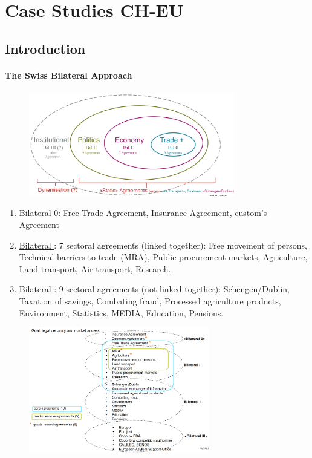 \section{Case Studies CH-EU}

\subsection{Introduction}

\paragraph{The Swiss Bilateral Approach}

\begin{figure}[H]
    \centering
    \includegraphics[width=0.8\textwidth]{Pictures/Swiss_Bilateral_Approach.png}
\end{figure}

\begin{enumerate}[]
    \item \underline{Bilateral $0$}: Free Trade Agreement, Insurance Agreement,
        custom's Agreement
    \item \underline{Bilateral }: 7 sectoral agreements (linked
        together): Free movement of persons, Technical barriers to trade
        (MRA), Public procurement markets, Agriculture, Land transport,
        Air transport, Research.
    \item \underline{Bilateral }: 9 sectoral agreements (not linked
        together): Schengen/Dublin, Taxation of savings, Combating fraud,
        Processed agriculture products, Environment, Statistics, MEDIA,
        Education, Pensions.
\end{enumerate}

\begin{figure}[h]
    \centering
    \includegraphics[width=0.7\textwidth]{Pictures/CH_EU_bilaterals.png}
\end{figure}

